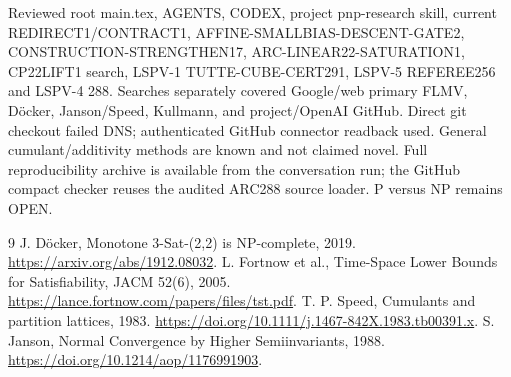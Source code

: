 \documentclass[10pt]{article}
\begin{document}
Reviewed root main.tex, AGENTS, CODEX, project pnp-research skill, current REDIRECT1/CONTRACT1, AFFINE-SMALLBIAS-DESCENT-GATE2, CONSTRUCTION-STRENGTHEN17, ARC-LINEAR22-SATURATION1, CP22LIFT1 search, LSPV-1 TUTTE-CUBE-CERT291, LSPV-5 REFEREE256 and LSPV-4 288. Searches separately covered Google/web primary FLMV, D\"ocker, Janson/Speed, Kullmann, and project/OpenAI GitHub. Direct git checkout failed DNS; authenticated GitHub connector readback used. General cumulant/additivity methods are known and not claimed novel. Full reproducibility archive is available from the conversation run; the GitHub compact checker reuses the audited ARC288 source loader. P versus NP remains OPEN.

\begin{thebibliography}{9}
 J. D\"ocker, Monotone 3-Sat-(2,2) is NP-complete, 2019. \url{https://arxiv.org/abs/1912.08032}.
 L. Fortnow et al., Time-Space Lower Bounds for Satisfiability, JACM 52(6), 2005. \url{https://lance.fortnow.com/papers/files/tst.pdf}.
 T. P. Speed, Cumulants and partition lattices, 1983. \url{https://doi.org/10.1111/j.1467-842X.1983.tb00391.x}.
 S. Janson, Normal Convergence by Higher Semiinvariants, 1988. \url{https://doi.org/10.1214/aop/1176991903}.
\end{thebibliography}
\end{document}

